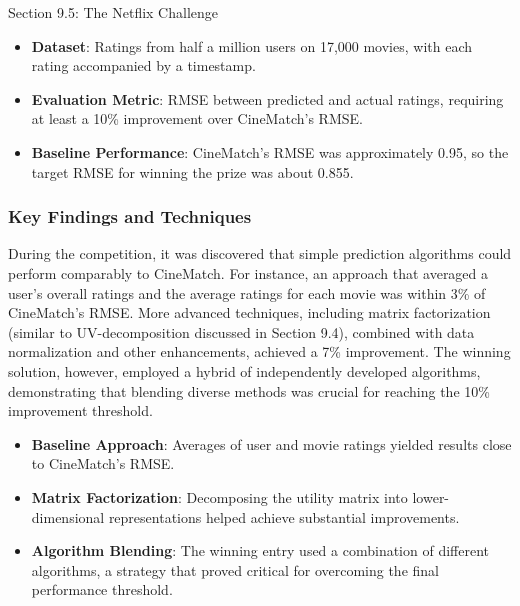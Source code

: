 \begin{notes}{Section 9.5: The Netflix Challenge}
    \begin{highlight}
        \begin{itemize}
            \item \textbf{Dataset}: Ratings from half a million users on 17,000 movies, with each rating accompanied by a timestamp.
            \item \textbf{Evaluation Metric}: RMSE between predicted and actual ratings, requiring at least a 10\% improvement over CineMatch's RMSE.
            \item \textbf{Baseline Performance}: CineMatch's RMSE was approximately 0.95, so the target RMSE for winning the prize was about 0.855.
        \end{itemize}
    \end{highlight}
    
    \subsubsection*{Key Findings and Techniques}
    
    During the competition, it was discovered that simple prediction algorithms could perform comparably to CineMatch. For instance, an approach that averaged a user's overall ratings and the average ratings 
    for each movie was within 3\% of CineMatch's RMSE. More advanced techniques, including matrix factorization (similar to UV-decomposition discussed in Section 9.4), combined with data normalization 
    and other enhancements, achieved a 7\% improvement. The winning solution, however, employed a hybrid of independently developed algorithms, demonstrating that blending diverse methods was crucial 
    for reaching the 10\% improvement threshold.
    
    \begin{highlight}
        \begin{itemize}
            \item \textbf{Baseline Approach}: Averages of user and movie ratings yielded results close to CineMatch's RMSE.
            \item \textbf{Matrix Factorization}: Decomposing the utility matrix into lower-dimensional representations helped achieve substantial improvements.
            \item \textbf{Algorithm Blending}: The winning entry used a combination of different algorithms, a strategy that proved critical for overcoming the final performance threshold.
        \end{itemize}
    \end{highlight}
    

\end{notes}
